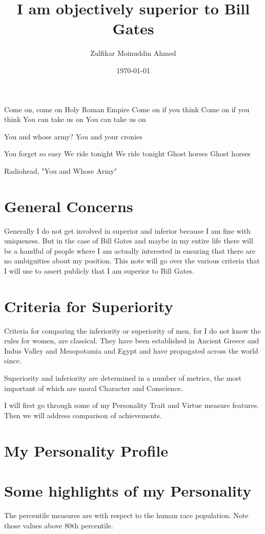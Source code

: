 \documentclass{amsart}
\title{I am objectively superior to Bill Gates}
\author{Zulfikar Moinuddin Ahmed}
\date{\today}
\begin{document}
\maketitle
\epigraph{Come on, come on
Holy Roman Empire
Come on if you think
Come on if you think
You can take us on
You can take us on

You and whose army?
You and your cronies

You forget so easy
We ride tonight
We ride tonight
Ghost horses
Ghost horses}{Radiohead, "You and Whose Army"}

\section{General Concerns}
Generally I do not get involved in superior and inferior because I am fine with uniqueness.  But in the case of Bill Gates and maybe in my entire life there will be a handful of people where I am actually interested in ensuring that there are no ambiguities about my position.  This note will go over the various criteria that I will use to assert publicly that I am superior to Bill Gates.

\section{Criteria for Superiority}
Criteria for comparing the inferiority or superiority of men, for I do not know the rules for women, are classical.  They have been established in Ancient Greece and Indus Valley and Mesopotamia and Egypt and have propagated across the world since.  

Superiority and inferiority are determined in a number of metrics, the most important of which are moral Character and Conscience.

I will first go through some of my Personality Trait and Virtue measure features.  Then we will address comparison of achievements.  

\section{My Personality Profile}


\section{Some highlights of my Personality}

The percentile measures are with respect to the human race population.  Note those values above 80th percentile.
\end{document}
